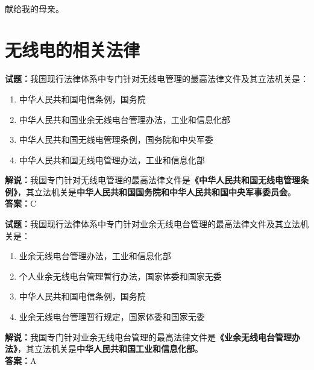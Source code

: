 \documentclass{ctexbook}
\newcommand{\commit}{\dots~(in \emph{packed-refs})}}
\begin{document}

\title{}
\author{\large \texttt{BG7XTQ}（原\texttt{JJ1DSB}）编著}
\date{\large{编译日期：\texttt{\today}}\\版本：\texttt{\commit}在分支\texttt{\branch}上}

\maketitle%

\thispagestyle{empty}
\vfil
\ \\
\vspace{15em}
\begin{center}
	{\Large 献给我的母亲。}
\end{center}

\newpage

\tableofcontents%






\chapter{无线电的相关法律}





\noindent\textbf{试题：}我国现行法律体系中专门针对无线电管理的最高法律文件及其立法机关是：
\begin{enumerate}[leftmargin=3em]
\item 中华人民共和国电信条例，国务院
\item 中华人民共和国业余无线电台管理办法，工业和信息化部
\item 中华人民共和国无线电管理条例，国务院和中央军委
\item 中华人民共和国无线电管理办法，工业和信息化部
\end{enumerate}
\noindent\textbf{解说：}我国专门针对无线电管理的最高法律文件是\textbf{《中华人民共和国无线电管理条例》}，其立法机关是\textbf{中华人民共和国国务院和中华人民共和国中央军事委员会}。\\\noindent\textbf{答案：}C

\bigskip


\noindent\textbf{试题：}我国现行法律体系中专门针对业余无线电台管理的最高法律文件及其立法机关是：
\begin{enumerate}[leftmargin=3em]
\item 业余无线电台管理办法，工业和信息化部
\item 个人业余无线电台管理暂行办法，国家体委和国家无委
\item 中华人民共和国电信条例，国务院
\item 业余无线电台管理暂行规定，国家体委和国家无委
\end{enumerate}
\noindent\textbf{解说：}我国专门针对业余无线电台管理的最高法律文件是\textbf{《业余无线电台管理办法》}，其立法机关是\textbf{中华人民共和国工业和信息化部}。\\\noindent\textbf{答案：}A
\end{document}
